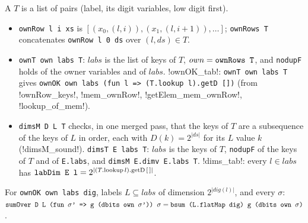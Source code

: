 \begin{definition}\label{def:lean-pathsum-owntab}
A  $T$ is a list of pairs (label, its digit variables, low digit first).
\begin{itemize}
\item \textnormal{\texttt{ownRow l i xs}} is $[(x_0,(l,i)),(x_1,(l,i+1)),\dots]$; \textnormal{\texttt{ownRows T}} concatenates
  \textnormal{\texttt{ownRow l 0 ds}} over $(l,ds)\in T$.
\item \textnormal{\texttt{ownT own labs T}}: $labs$ is the list of keys of $T$, $own=\textnormal{\texttt{ownRows T}}$, and
  \textnormal{\texttt{nodupF}} holds of the owner variables and of $labs$.
  \lean!ownOK_tab!: \textnormal{\texttt{ownT own labs T}} gives \textnormal{\texttt{ownOK own labs (fun l => (T.lookup l).getD [])}}
  (from \lean!ownRow_keys!, \lean!mem_ownRow!, \lean!getElem_mem_ownRow!, \lean!lookup_of_mem!).
\item \textnormal{\texttt{dimsM D L T}} checks, in one merged pass, that the keys of $T$ are a subsequence of the
  keys of $L$ in order, each with $D(k)=2^{|ds|}$ for its $L$ value $k$ (\lean!dimsM_sound!).
  \textnormal{\texttt{dimsT E labs T}}: $labs$ is the keys of $T$, \textnormal{\texttt{nodupF}} of the keys of $T$ and of
  \textnormal{\texttt{E.labs}}, and \textnormal{\texttt{dimsM E.dimv E.labs T}}. \lean!dims_tab!: every $l\in labs$ has
  $\textnormal{\texttt{labDim E l}} = 2^{|(T.\mathrm{lookup}\,l).\mathrm{getD}\,[\,]|}$.
\end{itemize}
\end{definition}

\begin{theorem}
For \textnormal{\texttt{ownOK own labs dig}}, labels $L\subseteq labs$ of dimension $2^{|\mathit{dig}(l)|}$, and
every $\sigma$: $\textnormal{\texttt{sumOver D L (\allowbreak{}fun \ensuremath{\sigma}' => g (\allowbreak{}dbits own \ensuremath{\sigma}')) \ensuremath{\sigma}}} = \textnormal{\texttt{bsum (\allowbreak{}L.\allowbreak{}flatMap dig) g (\allowbreak{}dbits own \ensuremath{\sigma})}}$.
\end{theorem}

